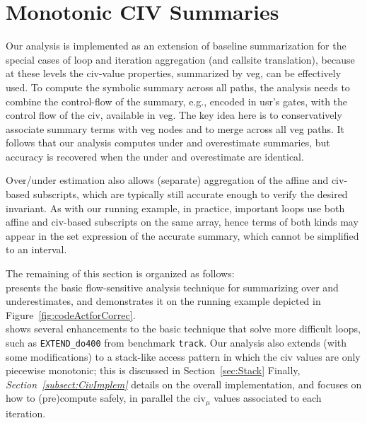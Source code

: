 \documentclass{sig-alternate}
\begin{document}
\section{Monotonic CIV Summaries}
\label{sec:MonotonicCiv}


Our analysis is implemented as an extension of baseline 
summarization for the special cases of loop and iteration 
aggregation (and callsite translation), because at these 
levels the {\sc civ}-value properties, summarized by 
{\sc veg}, can be effectively used.
%
To compute the symbolic summary across all paths, the analysis
needs to combine the control-flow of the summary, e.g., 
encoded in {\sc usr}'s gates, with the control flow of the 
{\sc civ}, available in {\sc veg}. 
The key idea here is to conservatively 
associate summary terms with {\sc veg} nodes
and to merge across all {\sc veg} paths.
It follows that our analysis computes under and overestimate
summaries, but accuracy is recovered when the under and 
overestimate are identical.
%

Over/under estimation also allows (separate) aggregation of the 
affine and {\sc civ}-based subscripts, which are typically
still accurate enough to verify the desired invariant.
%
%
As with our running example, in practice, important loops use both %
affine and {\sc civ}-based subscripts on the same array, hence 
terms of both kinds may appear in the set expression %
of the accurate summary, which cannot be simplified
to an interval.

The remaining of this section is organized as follows:\\
%
 presents the basic flow-sensitive 
analysis technique for summarizing over and underestimates, and 
demonstrates it on the running example depicted in 
Figure~\ref{fig:codeActforCorrec}.\\
%
 shows several enhancements
to the basic technique that solve %
more difficult loops, such as {\tt EXTEND\_do400} from benchmark {\tt track}.
%
Our analysis also extends (with some modifications) to a stack-like access 
pattern in which the {\sc civ} values are only piecewise monotonic;
this is discussed in Section~\ref{sec:Stack} 
%
Finally, {\em Section~\ref{subsect:CivImplem}} details on the overall 
implementation, and focuses on how to (pre)compute safely, in parallel 
the {\sc civ}$_\mu$ values associated to each iteration.
\end{document}
